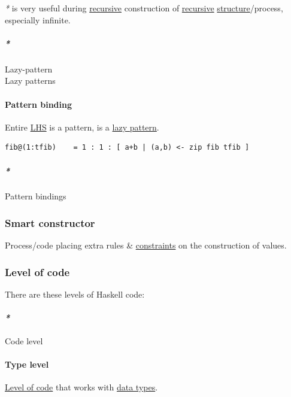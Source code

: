 \documentclass[11pt]{article}
\begin{document}
\emph{*} is very useful during \hyperref[org06bac4d]{recursive} construction of \hyperref[org06bac4d]{recursive} \hyperref[org93ee82c]{structure}/process, especially infinite.\\

\subparagraph{\emph{*}}
\label{sec:org1c9c020}

\label{orgcb0db0d}Lazy-pattern\\
\label{orgffebef0}Lazy patterns\\

\paragraph{\label{org4e9bf72}Pattern binding}
\label{sec:orgd9653a4}
Entire \hyperref[orgcb65c13]{LHS} is a pattern, is a \hyperref[org263341c]{lazy pattern}.\\

\begin{verbatim}
fib@(1:tfib)    = 1 : 1 : [ a+b | (a,b) <- zip fib tfib ]
\end{verbatim}

\subparagraph{\emph{*}}
\label{sec:orgdbb0a48}

\label{org71f165a}Pattern bindings\\

\subsubsection{\label{org10db8d4}Smart constructor}
\label{sec:org8293b08}
Process/code placing extra rules \& \hyperref[org76311a9]{constraints} on the construction of values.\\

\subsubsection{\label{org8bd4e7d}Level of code}
\label{sec:org6ad4392}
There are these levels of Haskell code:\\

\paragraph{\emph{*}}
\label{sec:orgcc8d5f0}

\label{org8285c31}Code level\\

\paragraph{\label{org01e5da3}Type level}
\label{sec:org5d37398}
\hyperref[org8bd4e7d]{Level of code} that works with \hyperref[org88981ee]{data types}.\\
\end{document}
